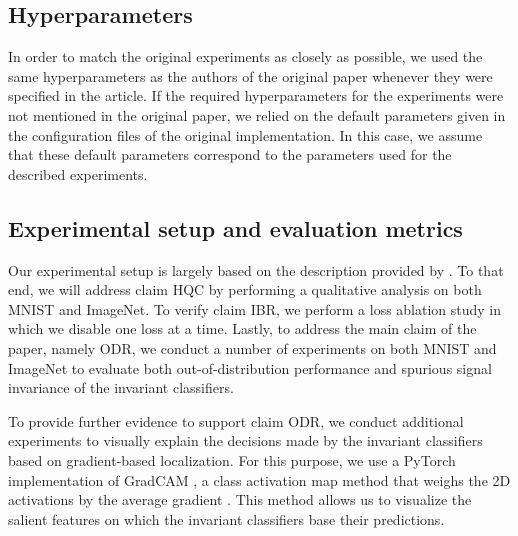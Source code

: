 
\subsection{Hyperparameters}
In order to match the original experiments as closely as possible, we used the same hyperparameters as the authors of the original paper whenever they were specified in the article. If the required hyperparameters for the experiments were not mentioned in the original paper, we relied on the default parameters given in the configuration files of the original implementation. In this case, we assume that these default parameters correspond to the parameters used for the described experiments.

\subsection{Experimental setup and evaluation metrics}
\label{subsec:expt}
Our experimental setup is largely based on the description provided by . To that end, we will address claim HQC by performing a qualitative analysis on both MNIST and ImageNet. 
To verify claim IBR, we perform a loss ablation study in which we disable one loss at a time. Lastly, to address the main claim of the paper, namely ODR, we conduct a number of experiments on both MNIST and ImageNet to evaluate both out-of-distribution performance and spurious signal invariance of the invariant classifiers. 

To provide further evidence to support claim ODR, we conduct additional experiments to visually explain the decisions made by the invariant classifiers based on gradient-based localization. For this purpose, we use a PyTorch implementation of GradCAM \cite{torchcam, gradcam}, a class activation map method that weighs the 2D activations by the average gradient \cite{gradcam}. This method allows us to visualize the salient features on which the invariant classifiers base their predictions.


